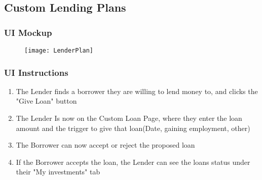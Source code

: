 \subsection{Custom Lending Plans}

\subsubsection{UI Mockup}

\begin{figure}[H]
\centering
\texttt{[image: LenderPlan]}
\end{figure}

\subsubsection{UI Instructions}

\begin{enumerate}
	\item The Lender finds a borrower they are willing to lend money to, and clicks the "Give Loan" button
	\item The Lender Is now on the Custom Loan Page, where they enter the loan amount and the trigger to give that loan(Date, gaining employment, other)
	\item The Borrower can now accept or reject the proposed loan
	\item If the Borrower accepts the loan, the Lender can see the loans status under their "My investments" tab
\end{enumerate}